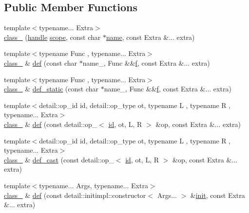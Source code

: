 \subsection*{Public Member Functions}
\begin{DoxyCompactItemize}
\item 
{\footnotesize template$<$typename... Extra$>$ }\\\mbox{\hyperlink{classclass___a0c0ddf3d9d90319b5ca87ebdcac4cf28}{class\+\_\+}} (\mbox{\hyperlink{classhandle}{handle}} \mbox{\hyperlink{structscope}{scope}}, const char $\ast$\mbox{\hyperlink{structname}{name}}, const Extra \&... extra)
\item 
{\footnotesize template$<$typename Func , typename... Extra$>$ }\\\mbox{\hyperlink{classclass__}{class\+\_\+}} \& \mbox{\hyperlink{classclass___a94b10f477ed961e4b85ea7da9eda16c7}{def}} (const char $\ast$name\+\_\+, Func \&\&\mbox{\hyperlink{_s_d_l__opengl__glext_8h_a691492ec0bd6383f91200e49f6ae40ed}{f}}, const Extra \&... extra)
\item 
{\footnotesize template$<$typename Func , typename... Extra$>$ }\\\mbox{\hyperlink{classclass__}{class\+\_\+}} \& \mbox{\hyperlink{classclass___a691aae941b44e34c7351731f269fcaff}{def\+\_\+static}} (const char $\ast$name\+\_\+, Func \&\&\mbox{\hyperlink{_s_d_l__opengl__glext_8h_a691492ec0bd6383f91200e49f6ae40ed}{f}}, const Extra \&... extra)
\item 
{\footnotesize template$<$detail\+::op\+\_\+id id, detail\+::op\+\_\+type ot, typename L , typename R , typename... Extra$>$ }\\\mbox{\hyperlink{classclass__}{class\+\_\+}} \& \mbox{\hyperlink{classclass___a33f32e20792b94c7dd2b6c8440d15050}{def}} (const detail\+::op\+\_\+$<$ \mbox{\hyperlink{_s_d_l__opengl__glext_8h_a58c2a664503e14ffb8f21012aabff3e9}{id}}, ot, L, R $>$ \&op, const Extra \&... extra)
\item 
{\footnotesize template$<$detail\+::op\+\_\+id id, detail\+::op\+\_\+type ot, typename L , typename R , typename... Extra$>$ }\\\mbox{\hyperlink{classclass__}{class\+\_\+}} \& \mbox{\hyperlink{classclass___a4cab61de13f33263eb6a31dd91dfdeb9}{def\+\_\+cast}} (const detail\+::op\+\_\+$<$ \mbox{\hyperlink{_s_d_l__opengl__glext_8h_a58c2a664503e14ffb8f21012aabff3e9}{id}}, ot, L, R $>$ \&op, const Extra \&... extra)
\item 
{\footnotesize template$<$typename... Args, typename... Extra$>$ }\\\mbox{\hyperlink{classclass__}{class\+\_\+}} \& \mbox{\hyperlink{classclass___a8b6307ed7817398318d1cc1609f69adf}{def}} (const detail\+::initimpl\+::constructor$<$ Args... $>$ \&\mbox{\hyperlink{pybind11_8h_a144961765ca31801e21d87651871934c}{init}}, const Extra \&... extra)

\end{DoxyCompactItemize}
